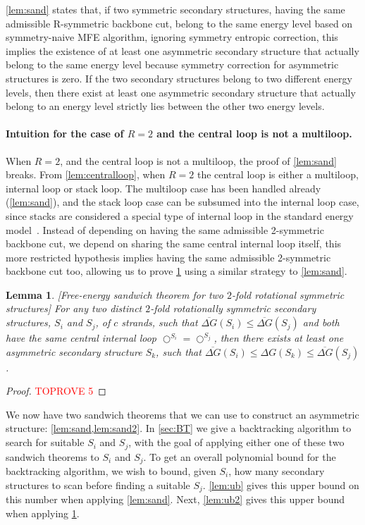 \documentclass[11pt,letterpaper]{article}  \usepackage[margin=1in]{geometry}
\newtheorem{lemma}[theorem]{Lemma}
\theoremstyle{definition}  \newtheorem{Definition}[theorem]{Definition}
\newcommand{\symnMFE}{symmetry-naive MFE\xspace}
\newcommand{\DGnosym}{\ensuremath{\overline{\Delta G}}}
\begin{document}
\cref{lem:sand} states that, if two symmetric secondary structures, having the same admissible R-symmetric backbone cut, belong to the same energy level based on \symnMFE algorithm, ignoring symmetry entropic correction, this implies the existence of at least one asymmetric secondary structure that actually belong to the same energy level because symmetry  correction for asymmetric structures is zero. If the two secondary structures belong to two different energy levels, then there exist at least one asymmetric secondary structure that actually belong to an energy level strictly lies between the other two energy levels.


\paragraph{Intuition for the case of $R=2$ and the central loop is not a multiloop.} 
When $R=2$, and the central loop is not a multiloop, the proof of \cref{lem:sand} breaks.   
From \cref{lem:centralloop}, when $R=2$ the central loop is either a multiloop, internal loop or stack loop. 
The multiloop case has been handled already (\cref{lem:sand}), and the stack loop case can be subsumed into the  internal loop case, since stacks are considered a special type of internal loop in the standard energy model~\cite{dirks2007thermodynamic}. 
Instead of depending on having the same admissible 2-symmetric backbone cut, we depend on sharing the same central internal loop itself, this more restricted hypothesis   implies having the same admissible 2-symmetric backbone cut too, allowing us to prove \cref{lem:sand2} using a similar strategy to  \cref{lem:sand}.  


\begin{lemma}\label{lem:sand2}[Free-energy sandwich theorem for two $2$-fold rotational symmetric structures]
	For any two distinct  $2$-fold rotationally symmetric secondary structures, $S_i$ and $S_j$, of $c$ strands, such that $\DGnosym(S_i) \leq \DGnosym(S_j)$ and both have the same central internal loop $\bigcirc^{S_i} = \bigcirc^{S_j}$, then there exists at least one asymmetric secondary structure $S_k$, such that $\DGnosym(S_i) \leq \Delta G(S_k) \leq \DGnosym(S_j)$.  
\end{lemma}
\begin{proof}\textcolor{red}{TOPROVE 5}\end{proof}

We now have two sandwich theorems that we can use to construct an asymmetric structure: \cref{lem:sand,lem:sand2}. In \cref{sec:BT} we give a backtracking algorithm to search for suitable $S_i$ and $S_j$, with the goal of  applying either one of these two sandwich theorems to $S_i$ and $S_j$. 
To get an overall polynomial bound for the backtracking algorithm, we wish to bound, given $S_i$, how many secondary structures to scan before finding a suitable $S_j$.    
\cref{lem:ub} gives this upper bound on this number  when applying \cref{lem:sand}. 
Next, \cref{lem:ub2} gives this upper bound  when applying  \cref{lem:sand2}. 
\end{document}
